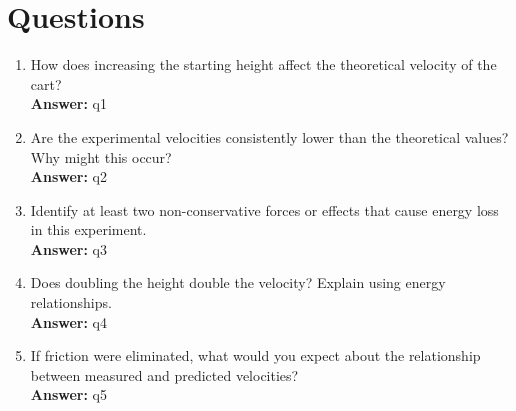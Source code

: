 \documentclass[12pt]{article}
\begin{document}
\section*{Questions}

\begin{enumerate}[label=\arabic*.]
    \item How does increasing the starting height affect the theoretical velocity of the cart?\\[0.3em]
    \textbf{Answer:} {{ q1 }}

    \item Are the experimental velocities consistently lower than the theoretical values? Why might this occur?\\[0.3em]
    \textbf{Answer:} {{ q2 }}

    \item Identify at least two non-conservative forces or effects that cause energy loss in this experiment.\\[0.3em]
    \textbf{Answer:} {{ q3 }}

    \item Does doubling the height double the velocity? Explain using energy relationships.\\[0.3em]
    \textbf{Answer:} {{ q4 }}

    \item If friction were eliminated, what would you expect about the relationship between measured and predicted velocities?\\[0.3em]
    \textbf{Answer:} {{ q5 }}
\end{enumerate}
\end{document}

